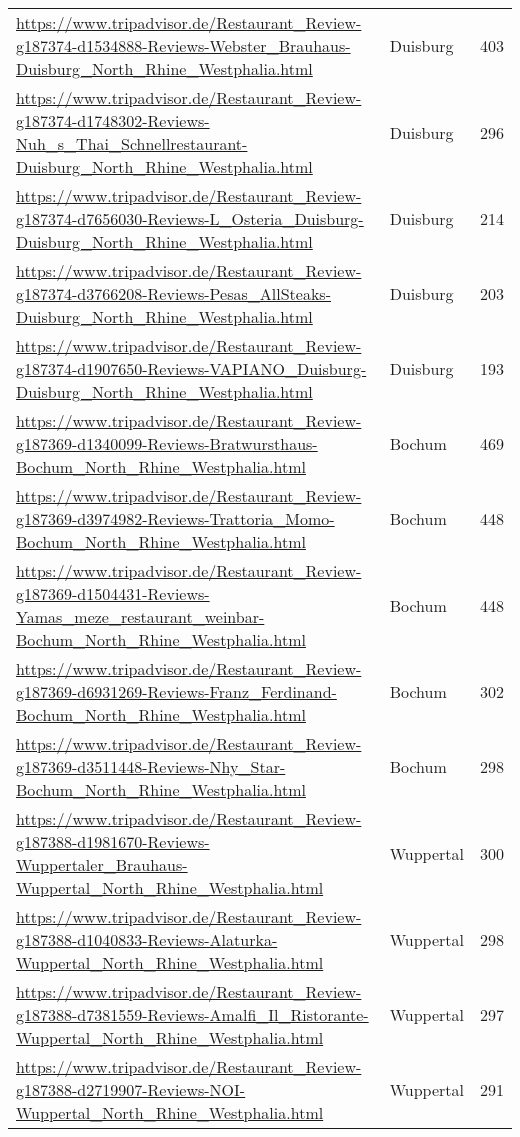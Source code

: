 \begin{table}[H]
{\begin{tabular}{llr}
\url{https://www.tripadvisor.de/Restaurant\_Review-g187374-d1534888-Reviews-Webster\_Brauhaus-Duisburg\_North\_Rhine\_Westphalia.html} & Duisburg & 403 \\ 
\url{https://www.tripadvisor.de/Restaurant\_Review-g187374-d1748302-Reviews-Nuh\_s\_Thai\_Schnellrestaurant-Duisburg\_North\_Rhine\_Westphalia.html} & Duisburg & 296 \\ 
\url{https://www.tripadvisor.de/Restaurant\_Review-g187374-d7656030-Reviews-L\_Osteria\_Duisburg-Duisburg\_North\_Rhine\_Westphalia.html} & Duisburg & 214 \\ 
\url{https://www.tripadvisor.de/Restaurant\_Review-g187374-d3766208-Reviews-Pesas\_AllSteaks-Duisburg\_North\_Rhine\_Westphalia.html} & Duisburg & 203 \\ 
\url{https://www.tripadvisor.de/Restaurant\_Review-g187374-d1907650-Reviews-VAPIANO\_Duisburg-Duisburg\_North\_Rhine\_Westphalia.html} & Duisburg & 193 \\ 
\url{https://www.tripadvisor.de/Restaurant\_Review-g187369-d1340099-Reviews-Bratwursthaus-Bochum\_North\_Rhine\_Westphalia.html} & Bochum & 469 \\ 
\url{https://www.tripadvisor.de/Restaurant\_Review-g187369-d3974982-Reviews-Trattoria\_Momo-Bochum\_North\_Rhine\_Westphalia.html} & Bochum & 448 \\ 
\url{https://www.tripadvisor.de/Restaurant\_Review-g187369-d1504431-Reviews-Yamas\_meze\_restaurant\_weinbar-Bochum\_North\_Rhine\_Westphalia.html} & Bochum & 448 \\ 
\url{https://www.tripadvisor.de/Restaurant\_Review-g187369-d6931269-Reviews-Franz\_Ferdinand-Bochum\_North\_Rhine\_Westphalia.html} & Bochum & 302 \\ 
\url{https://www.tripadvisor.de/Restaurant\_Review-g187369-d3511448-Reviews-Nhy\_Star-Bochum\_North\_Rhine\_Westphalia.html} & Bochum & 298 \\ 
\url{https://www.tripadvisor.de/Restaurant\_Review-g187388-d1981670-Reviews-Wuppertaler\_Brauhaus-Wuppertal\_North\_Rhine\_Westphalia.html} & Wuppertal & 300 \\ 
\url{https://www.tripadvisor.de/Restaurant\_Review-g187388-d1040833-Reviews-Alaturka-Wuppertal\_North\_Rhine\_Westphalia.html} & Wuppertal & 298 \\ 
\url{https://www.tripadvisor.de/Restaurant\_Review-g187388-d7381559-Reviews-Amalfi\_Il\_Ristorante-Wuppertal\_North\_Rhine\_Westphalia.html} & Wuppertal & 297 \\ 
\url{https://www.tripadvisor.de/Restaurant\_Review-g187388-d2719907-Reviews-NOI-Wuppertal\_North\_Rhine\_Westphalia.html} & Wuppertal & 291 \\ 

\end{tabular}}
\end{table}
